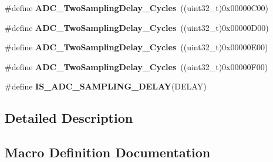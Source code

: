 \begin{DoxyCompactItemize}
\item 
\hypertarget{group___a_d_c__delay__between__2__sampling__phases_gaea74e18e420d600ea8a4c526f817f94d}{}\#define {\bfseries A\+D\+C\+\_\+\+Two\+Sampling\+Delay\+\_\+Cycles}~((uint32\+\_\+t)0x00000\+C00)\label{group___a_d_c__delay__between__2__sampling__phases_gaea74e18e420d600ea8a4c526f817f94d}

\item 
\hypertarget{group___a_d_c__delay__between__2__sampling__phases_gafeb801458d51f19e77ca6427126b4f35}{}\#define {\bfseries A\+D\+C\+\_\+\+Two\+Sampling\+Delay\+\_\+Cycles}~((uint32\+\_\+t)0x00000\+D00)\label{group___a_d_c__delay__between__2__sampling__phases_gafeb801458d51f19e77ca6427126b4f35}

\item 
\hypertarget{group___a_d_c__delay__between__2__sampling__phases_ga4a061cfb253b78537a899d7c49d5fb16}{}\#define {\bfseries A\+D\+C\+\_\+\+Two\+Sampling\+Delay\+\_\+Cycles}~((uint32\+\_\+t)0x00000\+E00)\label{group___a_d_c__delay__between__2__sampling__phases_ga4a061cfb253b78537a899d7c49d5fb16}

\item 
\hypertarget{group___a_d_c__delay__between__2__sampling__phases_gaf3b87ecc73e218042a64780ca3439d26}{}\#define {\bfseries A\+D\+C\+\_\+\+Two\+Sampling\+Delay\+\_\+Cycles}~((uint32\+\_\+t)0x00000\+F00)\label{group___a_d_c__delay__between__2__sampling__phases_gaf3b87ecc73e218042a64780ca3439d26}

\item 
\#define {\bfseries I\+S\+\_\+\+A\+D\+C\+\_\+\+S\+A\+M\+P\+L\+I\+N\+G\+\_\+\+D\+E\+L\+A\+Y}(D\+E\+L\+A\+Y)
\end{DoxyCompactItemize}


\subsection{Detailed Description}


\subsection{Macro Definition Documentation}
\hypertarget{group___a_d_c__delay__between__2__sampling__phases_ga4dc0ff663bd4283cf1032d7901175c8d}{}
